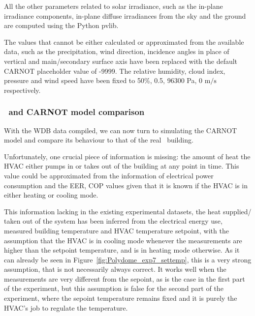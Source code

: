 All the other parameters related to solar irradiance, such as the in-plane
irradiance components, in-plane diffuse irradiances from the sky and the ground
are computed using the Python pvlib.

The values that cannot be either calculated or approximated from the available
data, such as the precipitation, wind direction, incidence angles in place of
vertical and main/secondary surface axis have been replaced with the default
CARNOT placeholder value of -9999. The relative humidity, cloud index, pressure
and wind speed have been fixed to 50\%, 0.5, 96300 Pa, 0 $\text{m}/\text{s}$
respectively.

\subsubsection{\pdome\ and CARNOT model comparison}\label{sec:CARNOT_comparison}

With the WDB data compiled, we can now turn to simulating the CARNOT model and
compare its behaviour to that of the real \pdome\ building. 

Unfortunately, one crucial piece of information is missing: the amount of heat
the HVAC either pumps in or takes out of the building at any point in time. This
value could be approximated from the information of electrical power consumption
and the EER, COP values given that it is known if the HVAC is in either heating
or cooling mode. 

This information lacking in the existing experimental datasets, the heat
supplied/ taken out of the system has been inferred from the electrical energy
use, measured building temperature and HVAC temperature setpoint, with the
assumption that the HVAC is in cooling mode whenever the measurements are
higher than the setpoint temperature, and is in heating mode otherwise. As it
can already be seen in Figure~\ref{fig:Polydome_exp7_settemp}, this is a very
strong assumption, that is not necessarily always correct. It works well when
the measurements are very different from the sepoint, as is the case in the
first part of the experiment, but this assumption is false for the second part
of the experiment, where the sepoint temperature remains fixed and it is purely
the HVAC's job to regulate the temperature.


